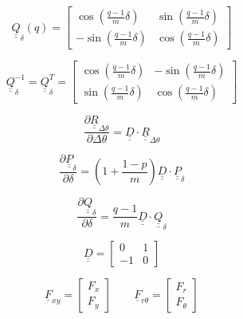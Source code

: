 \documentclass[a4paper]{jpconf}
\begin{document}
\begin{equation}
\underline{\underline{Q}}_{\delta}\left(q\right)=\begin{bmatrix}
\cos\left(\frac{q-1}{m}\delta\right) & \sin\left(\frac{q-1}{m}\delta\right) \\
-\sin\left(\frac{q-1}{m}\delta\right) & \cos\left(\frac{q-1}{m}\delta\right)
\end{bmatrix}
\end{equation}

\begin{equation}
\underline{\underline{Q}}_{\delta}^{-1}=\underline{\underline{Q}}_{\delta}^{T}=\begin{bmatrix}
\cos\left(\frac{q-1}{m}\delta\right) & -\sin\left(\frac{q-1}{m}\delta\right) \\
\sin\left(\frac{q-1}{m}\delta\right) & \cos\left(\frac{q-1}{m}\delta\right)
\end{bmatrix}
\end{equation}

\begin{equation}
\frac{\partial \underline{\underline{R}}_{\Delta\theta}}{\partial \Delta\theta}=\underline{\underline{D}}\cdot\underline{\underline{R}}_{\Delta\theta}
\end{equation}

\begin{equation}
\frac{\partial \underline{\underline{P}}_{\delta}}{\partial \delta}=\left(1+\frac{1-p}{m}\right)\underline{\underline{D}}\cdot\underline{\underline{P}}_{\delta}
\end{equation}

\begin{equation}
\frac{\partial \underline{\underline{Q}}_{\delta}}{\partial \delta}=\frac{q-1}{m}\underline{\underline{D}}\cdot\underline{\underline{Q}}_{\delta}
\end{equation}

\begin{equation}
\underline{\underline{D}}=\begin{bmatrix}
0 & 1\\
-1& 0
\end{bmatrix}
\end{equation}

\begin{equation}
\underline{F}_{xy}=\begin{bmatrix}
F_{x} \\
F_{y}
\end{bmatrix}\qquad\underline{F}_{r\theta}=\begin{bmatrix}
F_{r} \\
F_{\theta}
\end{bmatrix}
\end{equation}
\end{document}
